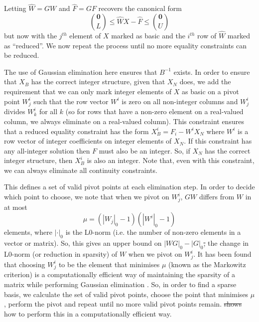 \documentclass{article}
\providecommand{\DIFaddtex}[1]{{\protect\color{blue}\uwave{#1}}} %
\providecommand{\DIFdeltex}[1]{{\protect\color{red}\sout{#1}}}                      %
\providecommand{\DIFaddbegin}{} %
\providecommand{\DIFaddend}{} %
\providecommand{\DIFdelbegin}{} %
\providecommand{\DIFdelend}{} %
\providecommand{\DIFadd}[1]{\texorpdfstring{\DIFaddtex{#1}}{#1}} %
\providecommand{\DIFdel}[1]{\texorpdfstring{\DIFdeltex{#1}}{}} %
\newcommand{\DIFscaledelfig}{0.5}
\newlength{\DIFdelgraphicswidth} %
\newlength{\DIFdelgraphicsheight} %
\newcommand{\DIFaddincludegraphics}[2][]{{\color{blue}\fbox{\DIFOincludegraphics[#1]{#2}}}} %
\newcommand{\DIFdelincludegraphics}[2][]{%
\sbox{\DIFdelgraphicsbox}{\DIFOincludegraphics[#1]{#2}}%
\settoboxwidth{\DIFdelgraphicswidth}{\DIFdelgraphicsbox} %
\settoboxtotalheight{\DIFdelgraphicsheight}{\DIFdelgraphicsbox} %
\scalebox{\DIFscaledelfig}{%
\parbox[b]{\DIFdelgraphicswidth}{\usebox{\DIFdelgraphicsbox}\\[-\baselineskip] \rule{\DIFdelgraphicswidth}{0em}}\llap{\resizebox{\DIFdelgraphicswidth}{\DIFdelgraphicsheight}{%
\setlength{\unitlength}{\DIFdelgraphicswidth}%
\begin{picture}(1,1)%
\thicklines\linethickness{2pt} %
{\color[rgb]{1,0,0}\put(0,0){\framebox(1,1){}}}%
{\color[rgb]{1,0,0}\put(0,0){\line( 1,1){1}}}%
{\color[rgb]{1,0,0}\put(0,1){\line(1,-1){1}}}%
\end{picture}%
}\hspace*{3pt}}} %
} %
\DeclareRobustCommand{\DIFaddbegin}{\DIFOaddbegin \let\includegraphics\DIFaddincludegraphics} %
\DeclareRobustCommand{\DIFaddend}{\DIFOaddend \let\includegraphics\DIFOincludegraphics} %
\DeclareRobustCommand{\DIFdelbegin}{\DIFOdelbegin \let\includegraphics\DIFdelincludegraphics} %
\DeclareRobustCommand{\DIFdelend}{\DIFOaddend \let\includegraphics\DIFOincludegraphics} %
\begin{document}
Letting $\hat{W} = GW$ and $\hat{F} = GF$ recovers the canonical form
\begin{equation}
{\mathbf{0} \choose L} \le \hat{W}X - \hat{F} \le {\mathbf{0} \choose U}
\label{eliminatedConstraint}
\end{equation}
but now with the $j^{th}$ element of $X$ marked as basic and the $i^{th}$ row of $\hat{W}$ marked as ``reduced''. We now repeat the process until no more equality constraints can be reduced.

The use of Gaussian elimination here ensures that $B^{-1}$ exists. In order to ensure that $X_B$ has the correct integer structure, given that $X_N$ does, we add the requirement that we can only mark integer elements of $X$ as basic on a pivot point $W^i_j$ such that the row vector $W^i$ is zero on all non-integer columns and $W^i_j$ divides $W^i_k$ for all $k$ (so for rows that have a non-zero element on a real-valued column, we always eliminate on a real-valued column). This constraint ensures that a reduced equality constraint has the form $X_B^i = F_i - W^iX_N$ where $W^i$ is a row vector of integer coefficients on integer elements of $X_N$. If this constraint has any all-integer solution then $F$ must also be an integer. So, if $X_N$ has the correct integer structure, then $X_B^i$ is also an integer. Note that, even with this constraint, we can always eliminate all continuity constraints.

This defines a set of valid pivot points at each elimination step. In order to decide which point to choose, we note that when we pivot on $W^i_j$, $GW$ differs from $W$ in at most 
\[
\mu = (\left|W_j\right|_0-1)(\left|W^i\right|_0-1)
\]
 elements, where $\left|\cdot\right|_0$ is the L0-norm (i.e. the number of non-zero elements in a vector or matrix). So, this gives an upper bound on $\left|WG\right|_0 - \left|G\right|_0$\DIFdelbegin \DIFdel{, }\DIFdelend \DIFaddbegin \DIFadd{; }\DIFaddend the change in L0-norm (or reduction in sparsity) of $W$ when we pivot on $W^i_j$. It has been found that choosing $W^i_j$ to be the element that minimises $\mu$ (known as the Markowitz criterion) is a computationally efficient way of maintaining the sparsity of a matrix while performing Gaussian elimination \citep*{markowitz1957elimination, suhl1990computing, maros2002computational}. So, in order to find a sparse basis, we calculate the set of valid pivot points, choose the point that minimises $\mu$, perform the pivot and repeat until no more valid pivot points remain. \citet{suhl1990computing} \DIFdelbegin \DIFdel{shows }\DIFdelend \DIFaddbegin \DIFadd{show }\DIFaddend how to perform this in a computationally efficient way.
\end{document}
